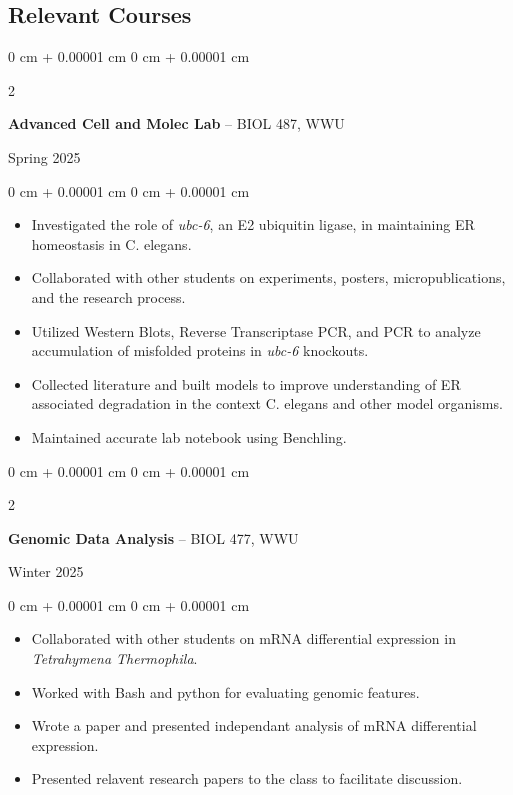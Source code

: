 \documentclass[10pt, article]{article}
\newenvironment{highlights}{
    \begin{itemize}[
        topsep=0.10 cm,
        parsep=0.10 cm,
        partopsep=0pt,
        itemsep=0pt,
        leftmargin=0 cm + 10pt
    ]
}{
    \end{itemize}
} %
\newenvironment{onecolentry}{
    \begin{adjustwidth}{
        0 cm + 0.00001 cm
    }{
        0 cm + 0.00001 cm
    }
}{
    \end{adjustwidth}
} %
\newenvironment{twocolentry}[2][]{
    \onecolentry
    \def\secondColumn{#2}
    \setcolumnwidth{\fill, 4.5 cm}
    \begin{paracol}{2}
}{
    \switchcolumn \raggedleft \secondColumn
    \end{paracol}
    \endonecolentry
} %
\begin{document}
    \begin{samepage}
    \section{Relevant Courses}

    \begin{twocolentry}
      {Spring 2025}
      \textbf{Advanced Cell and Molec Lab} -- BIOL 487, WWU
    \end{twocolentry}
      \begin{onecolentry}
        \begin{highlights}
        \item Investigated the role of \textit{ubc-6}, an E2 ubiquitin ligase, in maintaining ER homeostasis in C. elegans. 
        \item Collaborated with other students on experiments, posters, micropublications, and the research process.
        \item Utilized Western Blots, Reverse Transcriptase PCR, and PCR to analyze accumulation of misfolded proteins in \textit{ubc-6} knockouts.
        \item Collected literature and built models to improve understanding of ER associated degradation in the context C. elegans and other model organisms.
        \item Maintained accurate lab notebook using Benchling.
        \end{highlights}
      \end{onecolentry}

    \begin{twocolentry}
      {Winter 2025}
       \textbf{Genomic Data Analysis} -- BIOL 477, WWU
    \end{twocolentry}
      \begin{onecolentry}
        \begin{highlights}
        \item Collaborated with other students on mRNA differential expression in \textit{Tetrahymena Thermophila}.
        \item Worked with Bash and python for evaluating genomic features.
        \item Wrote a paper and presented independant analysis of mRNA differential expression.
        \item Presented relavent research papers to the class to facilitate discussion.
        \end{highlights}
      \end{onecolentry}

    \end{samepage}
\end{document}
